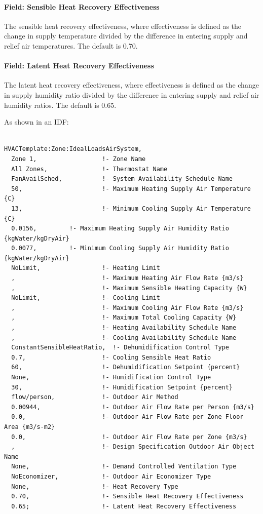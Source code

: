 \paragraph{Field: Sensible Heat Recovery Effectiveness}\label{field-sensible-heat-recovery-effectiveness}

The sensible heat recovery effectiveness, where effectiveness is defined as the change in supply temperature divided by the difference in entering supply and relief air temperatures. The default is 0.70.

\paragraph{Field: Latent Heat Recovery Effectiveness}\label{field-latent-heat-recovery-effectiveness}

The latent heat recovery effectiveness, where effectiveness is defined as the change in supply humidity ratio divided by the difference in entering supply and relief air humidity ratios. The default is 0.65.

As shown in an IDF:

\begin{lstlisting}

HVACTemplate:Zone:IdealLoadsAirSystem,
  Zone 1,                  !- Zone Name
  All Zones,               !- Thermostat Name
  FanAvailSched,           !- System Availability Schedule Name
  50,                      !- Maximum Heating Supply Air Temperature {C}
  13,                      !- Minimum Cooling Supply Air Temperature {C}
  0.0156,         !- Maximum Heating Supply Air Humidity Ratio {kgWater/kgDryAir}
  0.0077,         !- Minimum Cooling Supply Air Humidity Ratio {kgWater/kgDryAir}
  NoLimit,                 !- Heating Limit
  ,                        !- Maximum Heating Air Flow Rate {m3/s}
  ,                        !- Maximum Sensible Heating Capacity {W}
  NoLimit,                 !- Cooling Limit
  ,                        !- Maximum Cooling Air Flow Rate {m3/s}
  ,                        !- Maximum Total Cooling Capacity {W}
  ,                        !- Heating Availability Schedule Name
  ,                        !- Cooling Availability Schedule Name
  ConstantSensibleHeatRatio,  !- Dehumidification Control Type
  0.7,                     !- Cooling Sensible Heat Ratio
  60,                      !- Dehumidification Setpoint {percent}
  None,                    !- Humidification Control Type
  30,                      !- Humidification Setpoint {percent}
  flow/person,             !- Outdoor Air Method
  0.00944,                 !- Outdoor Air Flow Rate per Person {m3/s}
  0.0,                     !- Outdoor Air Flow Rate per Zone Floor Area {m3/s-m2}
  0.0,                     !- Outdoor Air Flow Rate per Zone {m3/s}
  ,                        !- Design Specification Outdoor Air Object Name
  None,                    !- Demand Controlled Ventilation Type
  NoEconomizer,            !- Outdoor Air Economizer Type
  None,                    !- Heat Recovery Type
  0.70,                    !- Sensible Heat Recovery Effectiveness
  0.65;                    !- Latent Heat Recovery Effectiveness
\end{lstlisting}

